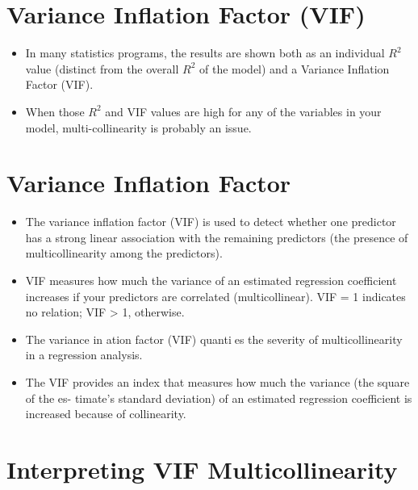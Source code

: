 \documentclass[a4paper,12pt]{article}
\begin{document}
\section*{Variance Inflation Factor (VIF)}
\begin{itemize}

\item In many statistics programs, the results are shown both
as an individual $R^2$ value (distinct from the overall $R^2$ of the model) and a Variance Inflation
Factor (VIF). 
\item When those $R^2$ and VIF values are high for any of the variables in your model,
multi-collinearity is probably an issue.

\end{itemize}




\section*{Variance Inflation Factor}
\begin{itemize}
\item The variance inflation factor (VIF) is used to detect whether one predictor has a strong linear
association with the remaining predictors (the presence of multicollinearity among the
predictors). 
\item VIF measures how much the variance of an estimated regression coefficient
increases if your predictors are correlated (multicollinear).
VIF = 1 indicates no relation; VIF > 1, otherwise.
\item The variance in
ation factor (VIF) quanties the severity of multicollinearity in a regression
analysis.
\item The VIF provides an index that measures how much the variance (the square of the es-
timate's standard deviation) of an estimated regression coefficient is increased because of
collinearity.

\end{itemize}



\section{Interpreting VIF Multicollinearity}
\end{document}

